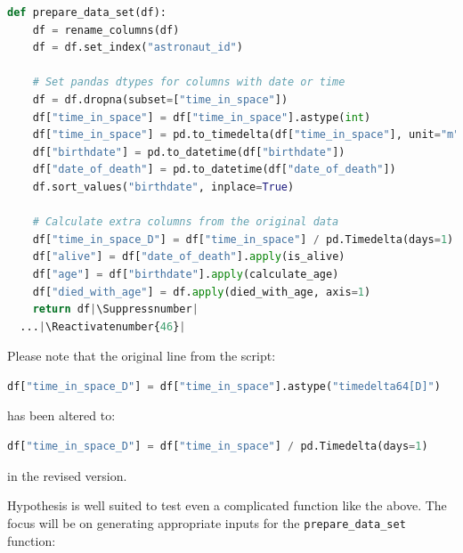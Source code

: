 \documentclass[runningheads]{llncs}
\makeatletter
\let\origthelstnumber\thelstnumber
\newcommand*\Suppressnumber{%
  \lst@AddToHook{OnNewLine}{%
    \let\thelstnumber\relax%
     \advance\c@lstnumber-\@ne\relax%
    }%
}
\newcommand*\Reactivatenumber[1]{%
  \setcounter{lstnumber}{\numexpr#1-1\relax}
  \lst@AddToHook{OnNewLine}{%
   \let\thelstnumber\origthelstnumber%
   \refstepcounter{lstnumber}%
  }%
}
\makeatother
\begin{document}
\begin{lstlisting}[language=Python,caption={Prepare Data Set from code/data\_analysis.ipynb}]
  def prepare_data_set(df):
    df = rename_columns(df)
    df = df.set_index("astronaut_id")

    # Set pandas dtypes for columns with date or time
    df = df.dropna(subset=["time_in_space"])
    df["time_in_space"] = df["time_in_space"].astype(int)
    df["time_in_space"] = pd.to_timedelta(df["time_in_space"], unit="m")
    df["birthdate"] = pd.to_datetime(df["birthdate"])
    df["date_of_death"] = pd.to_datetime(df["date_of_death"])
    df.sort_values("birthdate", inplace=True)

    # Calculate extra columns from the original data
    df["time_in_space_D"] = df["time_in_space"] / pd.Timedelta(days=1)
    df["alive"] = df["date_of_death"].apply(is_alive)
    df["age"] = df["birthdate"].apply(calculate_age)
    df["died_with_age"] = df.apply(died_with_age, axis=1)
    return df|\Suppressnumber|
  ...|\Reactivatenumber{46}|

\end{lstlisting}

\vspace{5mm}
\noindent Please note that the original line from the script:
\begin{lstlisting}[language=Python,caption={Prepare Data Set from code/data\_analysis.ipynb},firstnumber=14]
  df["time_in_space_D"] = df["time_in_space"].astype("timedelta64[D]")
\end{lstlisting}
has been altered to:
\begin{lstlisting}[language=Python,caption={Prepare Data Set from code/data\_analysis.ipynb},firstnumber=14]
  df["time_in_space_D"] = df["time_in_space"] / pd.Timedelta(days=1)
\end{lstlisting}
in the revised version.

\vspace{5mm}
\noindent Hypothesis is well suited to test even a complicated function like the above. The focus will be on generating appropriate inputs for the \texttt{prepare\_data\_set} function:
\end{document}
